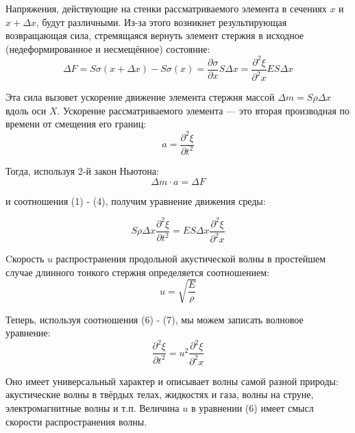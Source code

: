 \documentclass[a4paper, 12pt]{article}
\begin{document}
        Напряжения, действующие на стенки рассматриваемого элемента в сечениях $x$ и $x + \Delta x$, будут различными. Из-за этого возникнет результирующая возвращающая сила, стремящаяся вернуть элемент стержня в исходное (недеформированное и несмещённое) состояние:
        \begin{equation}
            \Delta F = S \sigma(x + \Delta x) - S \sigma(x) = \frac{\partial\sigma}{\partial x} S\Delta x = \frac{\partial^2\xi}{\partial^2 x} ES\Delta x
        \end{equation}

        Эта сила вызовет ускорение движение элемента стержня массой $\Delta m = S \rho \Delta x$ вдоль оси $X$. Ускорение рассматриваемого элемента — это вторая производная по времени от смещения его границ:
        \begin{equation}
            a = \frac{\partial^2 \xi}{\partial t^2}
        \end{equation}

        Тогда, используя 2-й закон Ньютона:
        \begin{equation}
            \Delta m \cdot a = \Delta F
        \end{equation}

        и соотношения (1) - (4), получим уравнение движения среды:

        \begin{equation}
            S \rho \Delta x \frac{\partial^2 \xi}{\partial t^2} = ES\Delta x \frac{\partial^2\xi}{\partial^2 x}
        \end{equation}

        Cкорость $u$ распространения продольной акустической волны в простейшем случае длинного тонкого стержня определяется соотношением:
        \begin{equation}
            u = \sqrt{\frac{E}{\rho}}
        \end{equation}

        Теперь, используя соотношения (6) - (7), мы можем записать волновое уравнение:
        \begin{equation}
            \frac{\partial^2 \xi}{\partial t^2} = u^2 \frac{\partial^2\xi}{\partial^2 x}
        \end{equation}
        
        Оно имеет универсальный характер и описывает волны самой разной природы: акустические волны в твёрдых телах, жидкостях и газа, волны на струне, электромагнитные волны и т.п. Величина $u$ в уравнении (6) имеет смысл скорости распространения волны.
\end{document}
